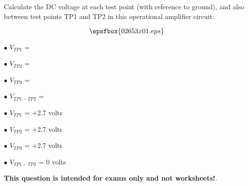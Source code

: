 

Calculate the DC voltage at each test point (with reference to ground), and also between test points TP1 and TP2 in this operational amplifier circuit:

$$\epsfbox{02653x01.eps}$$

\medskip
\item{$\bullet$} $V_{TP1}$ =
\item{$\bullet$} $V_{TP2}$ =
\item{$\bullet$} $V_{TP3}$ =
\item{$\bullet$} $V_{TP1-TP2}$ =
\medskip







\medskip
\goodbreak
\item{$\bullet$} $V_{TP1}$ = +2.7 volts
\item{$\bullet$} $V_{TP2}$ = +2.7 volts
\item{$\bullet$} $V_{TP3}$ = +2.7 volts
\item{$\bullet$} $V_{TP1-TP2}$ = 0 volts
\medskip







{\bf This question is intended for exams only and not worksheets!}.




